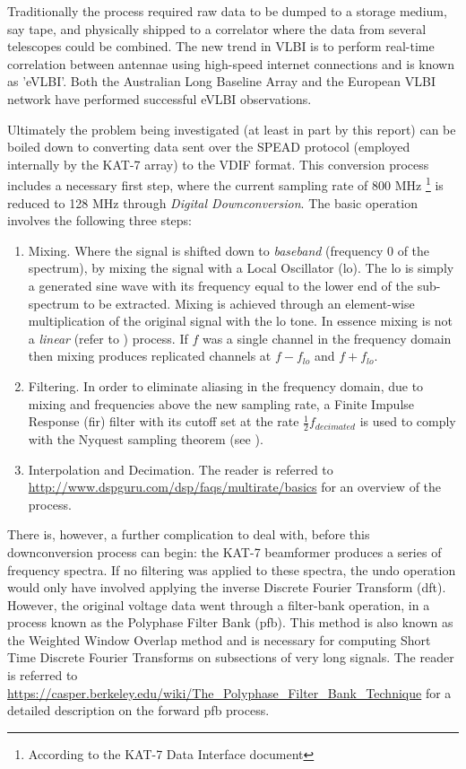 \documentclass[a4paper,10pt]{article}
\begin{document}
Traditionally the process required raw data to be dumped to a storage medium, say tape, and physically shipped to a correlator where the data from several 
telescopes could be combined. The new trend in VLBI is to perform real-time correlation between antennae using high-speed internet connections and is known
as 'eVLBI'. Both the Australian Long Baseline Array and the European VLBI network have performed successful eVLBI observations.

Ultimately the problem being investigated (at least in part by this report) can be boiled down to converting data sent over the SPEAD protocol (employed 
internally by the KAT-7 array) to the VDIF format. This conversion process includes a necessary first step, where the current sampling rate of 800 MHz
\footnote{According to the KAT-7 Data Interface document} is reduced to 128 MHz through \textit{Digital Downconversion}. The basic operation involves the following three
steps:
\begin{enumerate}
 \item Mixing. Where the signal is shifted down to \textit{baseband} (frequency 0 of the spectrum), by mixing the signal with a Local Oscillator (\gls{lo}).
 The \gls{lo} is simply a generated sine wave with its frequency equal to the lower end of the sub-spectrum to be extracted. Mixing is achieved through an 
 element-wise multiplication of the original signal with the \gls{lo} tone. In essence mixing is not a \textit{linear} (refer to \cite[ch. 5]{smith1997scientist}) 
 process. If $f$ was a single channel in the frequency domain then mixing produces replicated channels at $f - f_{lo}$ and $f + f_{lo}$.
 \item Filtering. In order to eliminate aliasing in the frequency domain, due to mixing and frequencies above the new sampling rate, a Finite Impulse Response 
 (\gls{fir}) filter with its cutoff set at the rate $\frac{1}{2}f_{decimated}$ is used to comply with the Nyquest sampling theorem (see \cite[ch. 3]{smith1997scientist}).
 \item Interpolation and Decimation. The reader is referred to \url{http://www.dspguru.com/dsp/faqs/multirate/basics} for an overview of the process.  
\end{enumerate}

There is, however, a further complication to deal with, before this downconversion process can begin: the KAT-7 beamformer produces a series of frequency spectra. If no filtering 
was applied to these spectra, the undo operation would only have involved applying the inverse Discrete Fourier Transform (\gls{dft}). However, the original voltage data went 
through a filter-bank operation, in a process known as the Polyphase Filter Bank (\gls{pfb}). This method is also known as the Weighted Window Overlap method and is necessary for computing 
Short Time Discrete Fourier Transforms on subsections of very long signals. The reader is referred to \url{https://casper.berkeley.edu/wiki/The_Polyphase_Filter_Bank_Technique} for a detailed 
description on the forward \gls{pfb} process.
\end{document}
